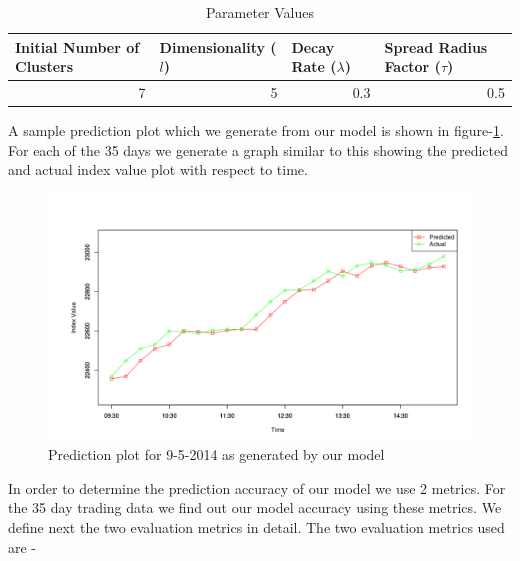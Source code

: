 \documentclass[a4paper,12bp]{report}
\begin{document}
\begin{table}[h]
\centering
\caption{Parameter Values}
\label{tab:parameter}
\vspace{15pt}
\begin{tabular}{|l|l|l|l|}
\hline
Initial Number of Clusters & Dimensionality ($l$)         & Decay Rate ($\lambda$)               & Spread Radius Factor ($\tau$)     \\ \hline
\multicolumn{1}{|r|}{7}    & \multicolumn{1}{r|}{5} & \multicolumn{1}{r|}{0.3} & \multicolumn{1}{r|}{0.5} \\ \hline
\end{tabular}
\end{table}


A sample prediction plot which we generate from our model is shown in figure-\ref{fig:error_plot}. For each of the 35 days we generate a graph similar to this showing the predicted and actual index value plot with respect to time.

\begin{figure}[htbp]
\centering
\includegraphics[scale = 0.4]{pictures/predictionResult.png}
\caption{Prediction plot for 9-5-2014 as generated by our model}
\label{fig:error_plot}
\end{figure}

In order to determine the prediction accuracy of our model we use 2 metrics. For the 35 day trading data we find out our model accuracy using these metrics. We define next the two evaluation metrics in detail.
\newpage
The two evaluation metrics used are -
\end{document}
